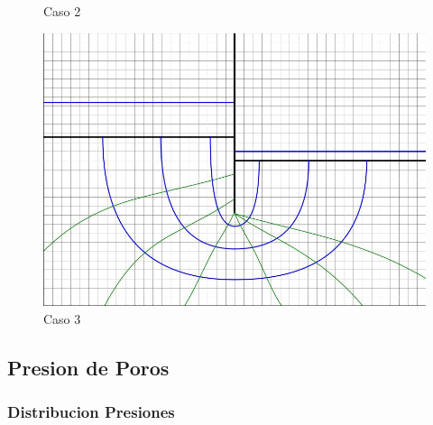 \begin{figure}[H]
\begin{minipage}{0.32\textwidth}
        \caption{Caso 2}
    \end{minipage}
    \begin{minipage}{0.32\textwidth}
        \centering
        \includegraphics[width=\textwidth]{GRAFICOS/caso_3.jpg}
        \caption{Caso 3}
    \end{minipage}
  \end{figure}

\subsection{Presion de Poros}

\subsubsection{Distribucion Presiones}


